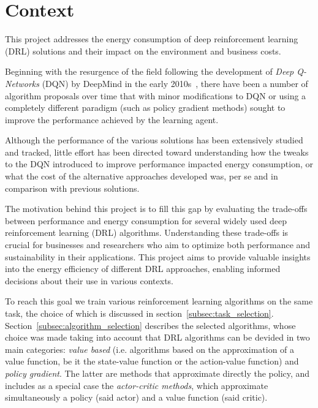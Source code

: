 \section{Context}
\label{sec:context}
This project addresses the energy consumption of deep reinforcement learning (DRL) solutions and their impact on the environment and business costs.

Beginning with the resurgence of the field following the development of \textit{Deep Q-Networks} (DQN) by DeepMind in the early 2010s~\cite{mnih:atari}, there have been a number of algorithm proposals over time that with minor modifications to DQN or using a completely different paradigm (such as policy gradient methods) sought to improve the performance achieved by the learning agent.

Although the performance of the various solutions has been extensively studied and tracked, little effort has been directed toward understanding how the tweaks to the DQN introduced to improve performance impacted energy consumption, or what the cost of the alternative approaches developed was, per se and in comparison with previous solutions.

The motivation behind this project is to fill this gap by evaluating the trade-offs between performance and energy consumption for several widely used deep reinforcement learning (DRL) algorithms. Understanding these trade-offs is crucial for businesses and researchers who aim to optimize both performance and sustainability in their applications. This project aims to provide valuable insights into the energy efficiency of different DRL approaches, enabling informed decisions about their use in various contexts.

To reach this goal we train various reinforcement learning algorithms on the same task, the choice of which is discussed in section~\vref{subsec:task_selection}. Section~\vref{subsec:algorithm_selection} describes the selected algorithms, whose choice was made taking into account that DRL algorithms can be devided in two main categories: \textit{value based} (i.e. algorithms based on the approximation of a value function, be it the state-value function or the action-value function) and \textit{policy gradient}. The latter are methods that approximate directly the policy, and includes as a special case the \textit{actor-critic methods}, which approximate simultaneously a policy (said actor) and a value function (said critic). 

